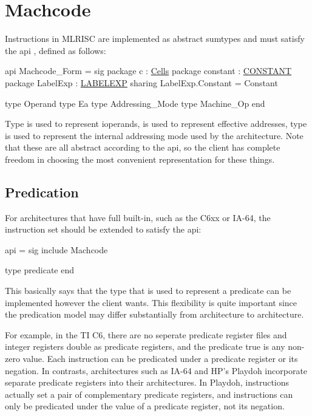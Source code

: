 \section{Machcode}

  Instructions in MLRISC are implemented as abstract sumtypes and
must satisfy the api 
, defined as follows:

\begin{SML}
api Machcode_Form =
sig
   package c        : \href{cells.html}{Cells}
   package constant : \href{constants.html}{CONSTANT}
   package LabelExp : \href{labelexp.html}{LABELEXP}
      sharing LabelExp.Constant = Constant

   type Operand
   type Ea
   type Addressing_Mode
   type Machine_Op
end
\end{SML}

Type  is used to represent ioperands,
 is used to represent effective addresses, type 
 is used to represent the internal addressing mode
used by the architecture.  Note that these are all abstract according to 
the api, so the client has complete freedom in choosing the most
convenient representation for these things.

\subsection{Predication}
   For architectures that have full 
built-in, such as the C6xx or IA-64, the instruction set should be
extended to satisfy the api: 
\begin{SML}
api  =
sig
   include Machcode
   
   type predicate  
end
\end{SML}
This basically says that the type that is used to represent a predicate
can be implemented however the client wants.  This flexibility
is quite important since the predication model may differ substantially
from architecture to architecture.

For example, in the TI C6, there are no seperate predicate register files
and integer registers double as predicate registers, and the predicate
true is any non-zero value.  Each instruction can be predicated under a
predicate register or its negation.  In contrasts, architectures such as
IA-64 and HP's Playdoh incorporate separate predicate registers into their 
architectures.  In Playdoh,  instructions 
actually set a pair of complementary predicate registers, 
and instructions can only
be predicated under the value of a predicate register, not its negation.

